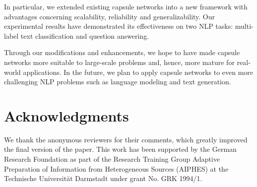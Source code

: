 \documentclass[11pt,a4paper]{article}
\newcommand{\1}{\boldsymbol{1}}
\begin{document}
In particular, we
extended existing capsule networks 
into a new framework with advantages concerning scalability, reliability and generalizability. 
Our experimental results have demonstrated its effectiveness on two NLP tasks: multi-label text classification and question answering.


Through our modifications and enhancements, we hope to have made capsule networks more suitable to large-scale problems and, hence, more mature for real-world applications.
In the future, we plan to apply capsule networks to even more challenging NLP problems such as language modeling and text generation.



\section{Acknowledgments}
We thank the anonymous reviewers for their comments, which greatly improved the final version of the paper. 
This work has been supported by the German Research Foundation as part of the Research Training
Group Adaptive Preparation of Information from Heterogeneous Sources (AIPHES) at the Technische
Universit\"at Darmstadt under grant No. GRK 1994/1.




\clearpage
\end{document}

